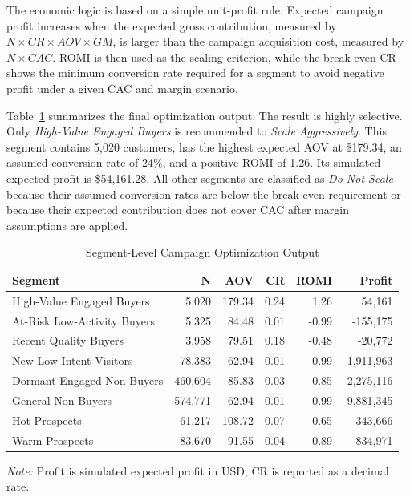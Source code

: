 \documentclass[conference]{IEEEtran}
\begin{document}
The economic logic is based on a simple unit-profit rule. Expected campaign profit increases when the expected gross contribution, measured by $N \times CR \times AOV \times GM$, is larger than the campaign acquisition cost, measured by $N \times CAC$. ROMI is then used as the scaling criterion, while the break-even CR shows the minimum conversion rate required for a segment to avoid negative profit under a given CAC and margin scenario.

Table~\ref{tab:segment_optimization_output} summarizes the final optimization output. The result is highly selective. Only \textit{High-Value Engaged Buyers} is recommended to \textit{Scale Aggressively}. This segment contains 5,020 customers, has the highest expected AOV at \$179.34, an assumed conversion rate of 24\%, and a positive ROMI of 1.26. Its simulated expected profit is \$54,161.28. All other segments are classified as \textit{Do Not Scale} because their assumed conversion rates are below the break-even requirement or because their expected contribution does not cover CAC after margin assumptions are applied.

\begin{table}[H]
\centering
\caption{Segment-Level Campaign Optimization Output}
\label{tab:segment_optimization_output}
\renewcommand{\arraystretch}{1.1}
\setlength{\tabcolsep}{2pt}
\scriptsize
\begin{tabular*}{\columnwidth}{| @{\extracolsep{\fill}}lrrrrr@{} |}
\toprule
\textbf{Segment} & \textbf{N} & \textbf{AOV} & \textbf{CR} & \textbf{ROMI} & \textbf{Profit} \\
\midrule
High-Value Engaged Buyers & 5{,}020 & 179.34 & 0.24 & 1.26 & 54{,}161 \\
At-Risk Low-Activity Buyers & 5{,}325 & 84.48 & 0.01 & -0.99 & -155{,}175 \\
Recent Quality Buyers & 3{,}958 & 79.51 & 0.18 & -0.48 & -20{,}772 \\
New Low-Intent Visitors & 78{,}383 & 62.94 & 0.01 & -0.99 & -1{,}911{,}963 \\
Dormant Engaged Non-Buyers & 460{,}604 & 85.83 & 0.03 & -0.85 & -2{,}275{,}116 \\
General Non-Buyers & 574{,}771 & 62.94 & 0.01 & -0.99 & -9{,}881{,}345 \\
Hot Prospects & 61{,}217 & 108.72 & 0.07 & -0.65 & -343{,}666 \\
Warm Prospects & 83{,}670 & 91.55 & 0.04 & -0.89 & -834{,}971 \\
\bottomrule
\end{tabular*}
\vspace{1pt}

\scriptsize{\textit{Note:} Profit is simulated expected profit in USD; CR is reported as a decimal rate.}
\end{table}
\end{document}
